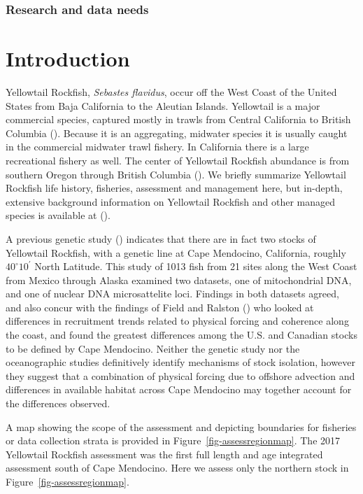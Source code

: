 \documentclass[
]{scrartcl}
\begin{document}
\subsubsection{Research and data needs}\label{research-and-data-needs}

\newpage{}

\section{Introduction}\label{introduction}

Yellowtail Rockfish, \emph{Sebastes flavidus}, occur off the West Coast
of the United States from Baja California to the Aleutian Islands.
Yellowtail is a major commercial species, captured mostly in trawls from
Central California to British Columbia (). Because it is an aggregating, midwater species it is usually
caught in the commercial midwater trawl fishery. In California there is
a large recreational fishery as well. The center of Yellowtail Rockfish
abundance is from southern Oregon through British Columbia
(). We briefly summarize
Yellowtail Rockfish life history, fisheries, assessment and management
here, but in-depth, extensive background information on Yellowtail
Rockfish and other managed species is available at
().

A previous genetic study ()
indicates that there are in fact two stocks of Yellowtail Rockfish, with
a genetic line at Cape Mendocino, California, roughly
\(40^\circ 10^\prime\) North Latitude. This study of 1013 fish from 21
sites along the West Coast from Mexico through Alaska examined two
datasets, one of mitochondrial DNA, and one of nuclear DNA
microsattelite loci. Findings in both datasets agreed, and also concur
with the findings of Field and Ralston () who looked at differences in recruitment trends
related to physical forcing and coherence along the coast, and found the
greatest differences among the U.S. and Canadian stocks to be defined by
Cape Mendocino. Neither the genetic study nor the oceanographic studies
definitively identify mechanisms of stock isolation, however they
suggest that a combination of physical forcing due to offshore advection
and differences in available habitat across Cape Mendocino may together
account for the differences observed.

A map showing the scope of the assessment and depicting boundaries for
fisheries or data collection strata is provided in
Figure~\ref{fig-assessregionmap}. The 2017 Yellowtail Rockfish
assessment was the first full length and age integrated assessment south
of Cape Mendocino. Here we assess only the northern stock in
Figure~\ref{fig-assessregionmap}.
\end{document}
